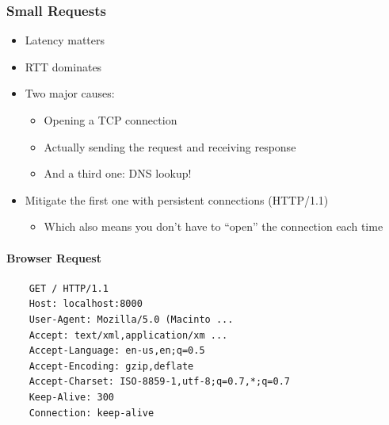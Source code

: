 \subsubsection{Small Requests}
\begin{itemize}[nosep]
    \item Latency matters
    \item RTT dominates
    \item Two major causes:
          \begin{itemize}[nosep]
              \item Opening a TCP connection
              \item Actually sending the request and receiving response
              \item And a third one: DNS lookup!
          \end{itemize}
    \item Mitigate the first one with persistent connections (HTTP/1.1)
          \begin{itemize}[nosep]
              \item Which also means you don't have to ``open'' the connection each time
          \end{itemize}
\end{itemize}

\paragraph{Browser Request}
\begin{verbatim}
    GET / HTTP/1.1
    Host: localhost:8000
    User-Agent: Mozilla/5.0 (Macinto ...
    Accept: text/xml,application/xm ...
    Accept-Language: en-us,en;q=0.5
    Accept-Encoding: gzip,deflate
    Accept-Charset: ISO-8859-1,utf-8;q=0.7,*;q=0.7
    Keep-Alive: 300
    Connection: keep-alive
\end{verbatim}

